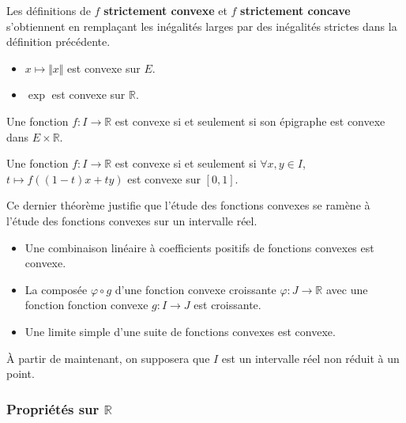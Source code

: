   \begin{remark}
    Les définitions de $f$ \textbf{strictement convexe} et $f$ \textbf{strictement concave} s'obtiennent en remplaçant les inégalités larges par des inégalités strictes dans la définition précédente.
  \end{remark}

  \begin{example}
    \begin{itemize}
      \item $x \mapsto \Vert x \Vert$ est convexe sur $E$.
      \item $\exp$ est convexe sur $\mathbb{R}$.
    \end{itemize}
  \end{example}

  \begin{proposition}
    Une fonction $f : I \rightarrow \mathbb{R}$ est convexe si et seulement si son épigraphe est convexe dans $E \times \mathbb{R}$.
  \end{proposition}

  \begin{theorem}
    Une fonction $f : I \rightarrow \mathbb{R}$ est convexe si et seulement si $\forall x, y \in I$, $t \mapsto f((1-t)x + ty)$ est convexe sur $[0,1]$.
  \end{theorem}

  Ce dernier théorème justifie que l'étude des fonctions convexes se ramène à l'étude des fonctions convexes sur un intervalle réel.

  \begin{proposition}
    \begin{itemize}
      \item Une combinaison linéaire à coefficients positifs de fonctions convexes est convexe.
      \item La composée $\varphi \circ g$ d'une fonction convexe croissante $\varphi : J \rightarrow \mathbb{R}$ avec une fonction fonction convexe $g : I \rightarrow J$ est croissante.
      \item Une limite simple d'une suite de fonctions convexes est convexe.
    \end{itemize}
  \end{proposition}

  À partir de maintenant, on supposera que $I$ est un intervalle réel non réduit à un point.

  \subsubsection{Propriétés sur \texorpdfstring{$\mathbb{R}$}{R}}

